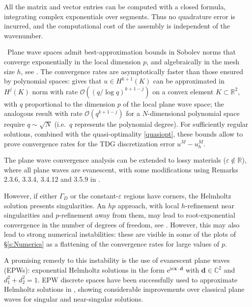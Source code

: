 \documentclass[a4paper,10pt]{article}
\newcommand{\IR}{{\mathbb R}}
\newcommand{\IC}{{\mathbb C}}
\newcommand{\bx}{{\mathbf x}}
\newcommand{\bd}{{\mathbf d}}
\newcommand{\ri}{{\mathrm i}}
\newcommand{\re}{{\mathrm e}}
\newcommand{\GD}{{\Gamma_D}}
\begin{document}
\begin{rem}
All the matrix and vector entries can be computed with a closed formula, integrating complex exponentials over segments.
Thus no quadrature error is incurred, and the computational cost of the assembly is independent of the wavenumber.
\end{rem}

\begin{rem}\label{rem:PWapprox} \
Plane wave spaces admit best-approximation bounds in Sobolev norms that converge exponentially in the local dimension $p$, and algebraically in the mesh size $h$, see \cite[Thm.~5.2, Cor.~5.5]{Moiola2011}.
The convergence rates are asymptotically faster than those ensured by polynomial spaces: \cite[eq.~(45)]{Moiola2011} gives that $u\in H^{k+1}(K)$ can be approximated in $H^j(K)$ norm with rate $\mathcal O((q/\log q)^{k+1-j})$ on a convex element $K\subset\IR^2$, with $q$ proportional to the dimension $p$ of the local plane wave space; the analogous result with rate $\mathcal O(q^{k+1-j})$  for a $N$-dimensional polynomial space require $q\sim\sqrt N$ (i.e.\ $q$ represents the polynomial degree).
For sufficiently regular solutions, combined with the quasi-optimality \eqref{quasiopt}, these bounds allow to prove convergence rates for the TDG discretization error $u^M-u^M_h$.

The plane wave convergence analysis can be extended to lossy materials ($\varepsilon\notin\IR$), where all plane waves are evanescent, with some modifications using Remarks 2.3.6, 3.3.4, 3.4.12 and 3.5.9 in \cite{AndreaPhD}.

However, if either $\GD$ or the constant-$\varepsilon$ regions have corners, the Helmholtz solution presents singularities.
An $hp$ approach, with local $h$-refinement near singularities and $p$-refinement away from them, may lead to root-exponential convergence in the number of degrees of freedom, see \cite{Hiptmair2016FoCM}.
However, this may also lead to strong numerical instabilities: these are visible in some of the plots of \S\ref{s:Numerics} as a flattening of the convergence rates for large values of $p$.

A promising remedy to this instability is the use of evanescent plane waves (EPWs): exponential Helmholtz solutions in the form $\re^{\ri\kappa\bx\cdot\bd}$ with $\bd\in\IC^2$ and $d_1^2+d_2^2=1$.
EPW discrete spaces have been successfully used to approximate Helmholtz solutions in \cite{Parolin2023,Robert2024}, showing considerable improvements over classical plane waves for singular and near-singular solutions.
\end{rem}
\end{document}

